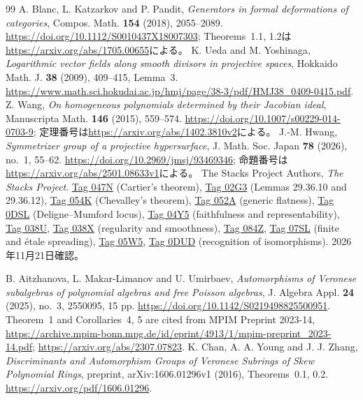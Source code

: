 \begin{thebibliography}{99}
 A. Blanc, L. Katzarkov and P. Pandit,
\emph{Generators in formal deformations of categories},
Compos. Math. \textbf{154} (2018), 2055--2089.
\url{https://doi.org/10.1112/S0010437X18007303};
Theorems~1.1, 1.2は\url{https://arxiv.org/abs/1705.00655}による。
 K. Ueda and M. Yoshinaga,
\emph{Logarithmic vector fields along smooth divisors in projective spaces},
Hokkaido Math. J. \textbf{38} (2009), 409--415, Lemma~3.
\url{https://www.math.sci.hokudai.ac.jp/hmj/page/38-3/pdf/HMJ38_0409-0415.pdf}.
 Z. Wang,
\emph{On homogeneous polynomials determined by their Jacobian ideal},
Manuscripta Math. \textbf{146} (2015), 559--574.
\url{https://doi.org/10.1007/s00229-014-0703-9};
定理番号は\url{https://arxiv.org/abs/1402.3810v2}による。
 J.-M. Hwang,
\emph{Symmetrizer group of a projective hypersurface},
J. Math. Soc. Japan \textbf{78} (2026), no.~1, 55--62.
\url{https://doi.org/10.2969/jmsj/93469346};
命題番号は\url{https://arxiv.org/abs/2501.08633v1}による。
The Stacks Project Authors,
\emph{The Stacks Project}.
\href{https://stacks.math.columbia.edu/tag/047N}{Tag 047N} (Cartier's theorem),
\href{https://stacks.math.columbia.edu/tag/02G3}{Tag 02G3}
(Lemmas 29.36.10 and 29.36.12),
\href{https://stacks.math.columbia.edu/tag/054K}{Tag 054K} (Chevalley's theorem),
\href{https://stacks.math.columbia.edu/tag/052A}{Tag 052A} (generic flatness),
\href{https://stacks.math.columbia.edu/tag/0DSL}{Tag 0DSL} (Deligne--Mumford locus),
\href{https://stacks.math.columbia.edu/tag/04Y5}{Tag 04Y5} (faithfulness and representability),
\href{https://stacks.math.columbia.edu/tag/038U}{Tag 038U},
\href{https://stacks.math.columbia.edu/tag/038X}{Tag 038X} (regularity and smoothness),
\href{https://stacks.math.columbia.edu/tag/084Z}{Tag 084Z},
\href{https://stacks.math.columbia.edu/tag/07SL}{Tag 07SL} (finite and \'etale spreading),
\href{https://stacks.math.columbia.edu/tag/05W5}{Tag 05W5},
\href{https://stacks.math.columbia.edu/tag/0DUD}{Tag 0DUD} (recognition of isomorphisms).
2026年11月21日確認。

B. Aitzhanova, L. Makar-Limanov and U. Umirbaev,
\emph{Automorphisms of Veronese subalgebras of polynomial algebras and free Poisson algebras},
J. Algebra Appl. \textbf{24} (2025), no.~3, 2550095, 15 pp.
\url{https://doi.org/10.1142/S0219498825500951}.
Theorem~1 and Corollaries~4, 5 are cited from MPIM Preprint 2023-14,
\url{https://archive.mpim-bonn.mpg.de/id/eprint/4913/1/mpim-preprint_2023-14.pdf};
\url{https://arxiv.org/abs/2307.07823}.
K. Chan, A. A. Young and J. J. Zhang,
\emph{Discriminants and Automorphism Groups of Veronese Subrings of Skew Polynomial Rings},
preprint, arXiv:1606.01296v1 (2016), Theorems~0.1, 0.2.
\url{https://arxiv.org/pdf/1606.01296}.


\end{thebibliography}
